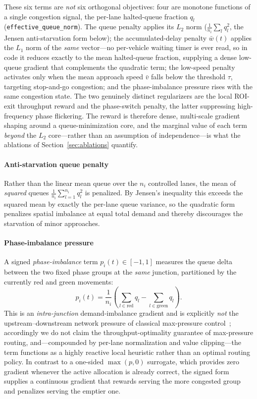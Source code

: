These six terms are \emph{not} six orthogonal objectives: four are monotone functions of a
single congestion signal, the per-lane halted-queue fraction $q_l$
(\texttt{effective\_queue\_norm}). The queue penalty applies its $L_2$ norm
($\frac{1}{n_i}\sum_l q_l^2$, the Jensen anti-starvation form below); the accumulated-delay
penalty $\bar{w}(t)$ applies the $L_1$ norm of the \emph{same} vector---no per-vehicle
waiting timer is ever read, so in code it reduces exactly to the mean halted-queue
fraction, supplying a dense low-queue gradient that complements the quadratic term; the
low-speed penalty activates only when the mean approach speed $\bar{v}$ falls below the
threshold $\tau$, targeting stop-and-go congestion; and the phase-imbalance pressure rises
with the same congestion state. The two genuinely distinct regularizers are the local
ROI-exit throughput reward and the phase-switch penalty, the latter suppressing
high-frequency phase flickering. The reward is therefore dense, multi-scale gradient
shaping around a queue-minimization core, and the marginal value of each term
\emph{beyond} the $L_2$ core---rather than an assumption of independence---is what the
ablations of Section~\ref{sec:ablations} quantify.

\paragraph{Anti-starvation queue penalty}
Rather than the linear mean queue over the $n_i$ controlled lanes, the mean of
\emph{squared} queues $\frac{1}{n_i}\sum_{l=1}^{n_i} q_l^2$ is penalized. By Jensen's
inequality this exceeds the squared mean by exactly the per-lane queue variance, so the
quadratic form penalizes spatial imbalance at equal total demand and thereby discourages
the starvation of minor approaches.

\paragraph{Phase-imbalance pressure}
A signed \emph{phase-imbalance} term $p_i(t) \in [-1, 1]$ measures the queue delta between the
two fixed phase groups at the \emph{same} junction, partitioned by the currently red and green
movements:
\begin{equation}
p_i(t) = \frac{1}{n_i} \left( \sum_{l \in \text{red}} q_l - \sum_{l \in \text{green}} q_l \right).
\label{eq:pressure}
\end{equation}
This is an \emph{intra-junction} demand-imbalance gradient and is explicitly \emph{not} the
upstream--downstream network pressure of classical max-pressure
control~\cite{varaiya2013_maxpressure}; accordingly we do not claim the throughput-optimality
guarantee of max-pressure routing, and---compounded by per-lane normalization and value
clipping---the term functions as a highly reactive local heuristic rather than an optimal
routing policy. In contrast to a one-sided $\max(p, 0)$ surrogate, which provides zero gradient
whenever the active allocation is already correct, the signed form supplies a continuous
gradient that rewards serving the more congested group and penalizes serving the emptier one.

